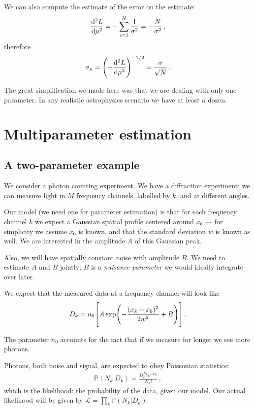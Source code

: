 \documentclass[main.tex]{subfiles}
\begin{document}
We can also compute the estimate of the error on the estimate: 
%
\begin{align}
\dv[2]{L}{\mu } =- \sum_{i=1}^{N} \frac{1}{\sigma^2} = - \frac{N}{\sigma^2}
\,,
\end{align}
%
therefore 
%
\begin{align}
\sigma_\mu = \qty(- \dv[2]{L}{\mu })^{-1/2} = \frac{\sigma}{\sqrt{N}}
\,.
\end{align}

The great simplification we made here was that we are dealing with only one parameter.
In any realistic astrophysics scenario we have at least a dozen. 

\section{Multiparameter estimation}

\subsection{A two-parameter example}

We consider a photon counting experiment. 
We have a diffraction experiment: we can measure light in \(M\) frequency channels, labelled by \(k\), and at different angles. 

Our model (we need one for parameter estimation) is that for each frequency channel \(k\) we expect a Gaussian spatial profile centered around \(x_0 \) --- for simplicity we assume \(x_0 \) is known, and that the standard deviation \(w\) is known as well.
We are interested in the amplitude \(A\) of this Gaussian peak.

Also, we will have spatially constant noise with amplitude \(B\).
We need to estimate \(A\) and \(B\) jointly; \(B\) is a \emph{nuisance parameter} we would ideally integrate over later. 

We expect that the measured data at a frequency channel will look like 
%
\begin{align}
D_k = n_0 \qty[ A\exp(- \frac{(x_k - x_0)^2}{2 w^2} + B)]
\,.
\end{align}

The parameter \(n_0 \) accounts for the fact that if we measure for longer we see more photons. 

Photons, both noise and signal, are expected to obey Poissonian statistics: 
%
\begin{align}
\mathbb{P}(N_k | D_k) = \frac{D_k^{N_k} e^{- D_k}}{N_k!}
\,,
\end{align}
%
which is the likelihood: the probability of the data, given our model. 
Our actual likelihood will be given by \(\mathscr{L} = \prod_k \mathbb{P}(N_k | D_k)\).
\end{document}
